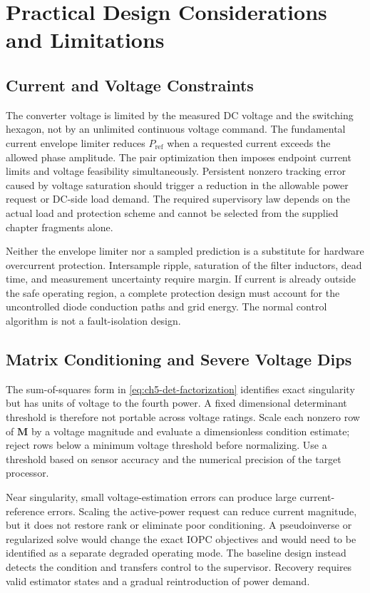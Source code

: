 \section{Practical Design Considerations and Limitations}
\label{sec:ch5-limitations}
\subsection{Current and Voltage Constraints}
The converter voltage is limited by the measured DC voltage and the switching hexagon, not by an unlimited continuous voltage command. The fundamental current envelope limiter reduces $P_{\mathrm{ref}}$ when a requested current exceeds the allowed phase amplitude. The pair optimization then imposes endpoint current limits and voltage feasibility simultaneously. Persistent nonzero tracking error caused by voltage saturation should trigger a reduction in the allowable power request or DC-side load demand. The required supervisory law depends on the actual load and protection scheme and cannot be selected from the supplied chapter fragments alone.

Neither the envelope limiter nor a sampled prediction is a substitute for hardware overcurrent protection. Intersample ripple, saturation of the filter inductors, dead time, and measurement uncertainty require margin. If current is already outside the safe operating region, a complete protection design must account for the uncontrolled diode conduction paths and grid energy. The normal control algorithm is not a fault-isolation design.

\subsection{Matrix Conditioning and Severe Voltage Dips}
The sum-of-squares form in \eqref{eq:ch5-det-factorization} identifies exact singularity but has units of voltage to the fourth power. A fixed dimensional determinant threshold is therefore not portable across voltage ratings. Scale each nonzero row of $\mathbf M$ by a voltage magnitude and evaluate a dimensionless condition estimate; reject rows below a minimum voltage threshold before normalizing. Use a threshold based on sensor accuracy and the numerical precision of the target processor.

Near singularity, small voltage-estimation errors can produce large current-reference errors. Scaling the active-power request can reduce current magnitude, but it does not restore rank or eliminate poor conditioning. A pseudoinverse or regularized solve would change the exact IOPC objectives and would need to be identified as a separate degraded operating mode. The baseline design instead detects the condition and transfers control to the supervisor. Recovery requires valid estimator states and a gradual reintroduction of power demand.

